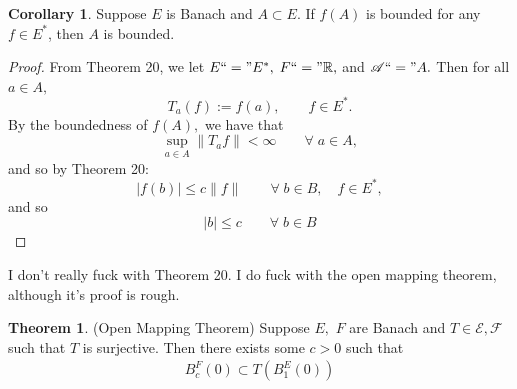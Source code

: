 \documentclass[10pt, oneside]{article}
\newcommand{\bbR}{\mathbb{R}}
\theoremstyle{definition}
\newtheorem{thm}{Theorem}
\newtheorem{cor}{Corollary}
\begin{document}
\begin{cor}
    Suppose $E$ is Banach and $A\subset E.$ If $f(A)$ is bounded for any $f\in E^*$, then $A$ is bounded.  
\end{cor}
\begin{proof}
    From Theorem 20, we let $E ``="E^*,$ $F``=" \bbR,$ and $\mathcal{A} ``=" A.$ Then for all $a\in A,$ 
    \[T_a(f) := f(a), \qquad f\in E^*.\] By the boundedness of $f(A),$ we have that 
    \[\sup_{a\in A}\|T_a f\|< \infty \qquad \forall \; a\in A,\] and so by Theorem 20:
    \[|f(b)| \leq c\|f\| \qquad \forall \; b\in B,\quad f\in E^*,\] and so 
    \[|b| \leq c \qquad \forall \; b\in B\]
\end{proof}
I don't really fuck with Theorem 20. I do fuck with the open mapping theorem, although it's proof is rough.
\begin{thm}
(Open Mapping Theorem)
    Suppose $E,$ $F$ are Banach and $T\in \mathcal{E, F}$ such that $T$ is surjective. Then there exists some $c>0$ such that 
    \begin{align}
        B^F_c(0)\subset T(B_1^E(0))
    \end{align}
\end{thm}
\end{document}
